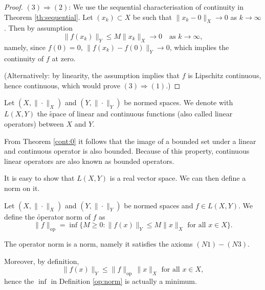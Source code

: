 \begin{proof}
$(3)\Rightarrow (2)$: We use the sequential characterisation of continuity in Theorem \ref{th:sequential}. Let $(x_k)\subset X$ be such that $\|x_k-0\|_X \to 0$ as $k\to \infty$. Then by assumption 
$$
\|f(x_k)\|_Y \leq M\|x_k\|_X \to 0 \quad \textrm{as } k\to \infty,
$$
namely, since $f(0)=0$, $\|f(x_k) - f(0)\|_Y \to 0$, which implies the continuity of $f$ at zero.

(Alternatively: by linearity, the assumption implies that $f$ is Lipschitz continuous, hence continuous, which would prove $(3)\Rightarrow (1)$.)
\end{proof}

\np

\begin{definition}
Let $(X,\| \cdot \|_X)$ and $(Y,\|\cdot  \|_Y)$ be normed spaces. We denote with $L(X,Y)$ the \h{space of linear and continuous functions} (also called linear operators) between $X$ and $Y$.
\end{definition}


\begin{remark}
From Theorem \ref{cont:0} it follows that the image of a bounded set under a linear and continuous operator is also bounded. Because of this property, continuous linear operators are also known as bounded operators.
\end{remark}


It is easy to show that $L(X,Y)$ is a real vector space. We can then define a norm on it.

\np

\begin{definition}%
\label{op:norm}
Let $(X,\| \cdot \|_X)$ and $(Y,\|\cdot  \|_Y)$ be normed spaces and $f\in L(X,Y)$. We define the \h{operator norm} of $f$ as 
$$
\|f\|_{{\textrm{op}}} = \inf\{M\ge 0 : \|f(x)\|_Y \le M \|x\|_X \mbox{ for all } x\in X\}.
$$
\end{definition}

\begin{remark}
The operator norm is a norm, namely it satisfies the axioms $(N1)-(N3)$. 

Moreover, by definition,
$$
\|f(x)\|_Y \le \|f\|_{{\textrm{op}}}\, \|x\|_X \mbox{ for all } x\in X,
$$
hence the $\inf$ in Definition \ref{op:norm} is actually a minimum.
\end{remark}

\np

